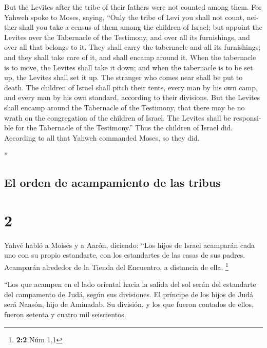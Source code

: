 \begin{paracol}{2}
\begin{otherlanguage}{english}
 But the Levites after the tribe of their fathers were
not counted among them.  For Yahweh spoke to Moses,
saying,  ``Only the tribe of Levi you shall not count,
neither shall you take a census of them among the children of Israel;
 but appoint the Levites over the Tabernacle of the
Testimony, and over all its furnishings, and over all that belongs to
it. They shall carry the tabernacle and all its furnishings; and they
shall take care of it, and shall encamp around it.  When
the tabernacle is to move, the Levites shall take it down; and when the
tabernacle is to be set up, the Levites shall set it up. The stranger
who comes near shall be put to death.  The children of
Israel shall pitch their tents, every man by his own camp, and every man
by his own standard, according to their divisions.  But
the Levites shall encamp around the Tabernacle of the Testimony, that
there may be no wrath on the congregation of the children of Israel. The
Levites shall be responsible for the Tabernacle of the Testimony.''
 Thus the children of Israel did. According to all that
Yahweh commanded Moses, so they did.

\end{otherlanguage}

\switchcolumn[0]*

\hypertarget{el-orden-de-acampamiento-de-las-tribus}{%
\subsection{El orden de acampamiento de las
tribus}\label{el-orden-de-acampamiento-de-las-tribus}}

\hypertarget{section-2}{%
\section{2}\label{section-2}}

 Yahvé habló a Moisés y a Aarón, diciendo: 
``Los hijos de Israel acamparán cada uno con su propio estandarte, con
los estandartes de las casas de sus padres. Acamparán alrededor de la
Tienda del Encuentro, a distancia de ella. \footnote{\textbf{2:2} Núm
  1,1}

 ``Los que acampen en el lado oriental hacia la salida del
sol serán del estandarte del campamento de Judá, según sus divisiones.
El príncipe de los hijos de Judá será Naasón, hijo de Aminadab.
 Su división, y los que fueron contados de ellos, fueron
setenta y cuatro mil seiscientos.


\end{paracol}
